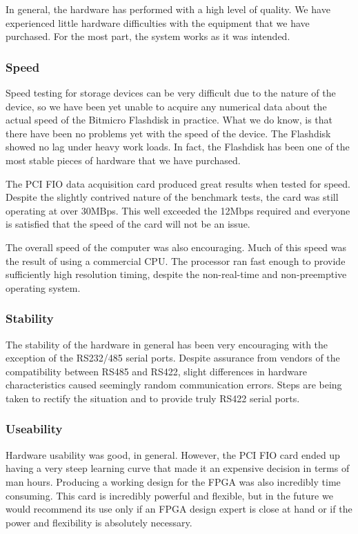 \documentclass[11pt,titlepage]{article}
\begin{document}
In general, the hardware has performed with a high level of quality. We have experienced little hardware difficulties with the equipment that 
we have purchased. For the most part, the system works as it was
intended. 

\subsubsection{Speed}
Speed testing for storage devices can be very difficult due to the nature of the device, so we have been yet unable to acquire any numerical
data about the actual speed of the Bitmicro Flashdisk in practice. What we do know, is that there have been no problems yet with the speed of
the device. The Flashdisk showed no lag under heavy work loads. In fact, the Flashdisk has been one of the most stable pieces of hardware that
we have purchased.

The PCI FIO data acquisition card produced great results when tested for speed. Despite the slightly contrived nature of the benchmark tests, 
the card was still operating at over 30MBps. This well exceeded the 12Mbps required and everyone is satisfied that the speed of the card will
not be an issue.

The overall speed of the computer was also encouraging. Much of this speed was the result of using a commercial CPU. The processor ran fast enough
to provide sufficiently high resolution timing, despite the non-real-time and non-preemptive operating system.
 
\subsubsection{Stability}

The stability of the hardware in general has been very encouraging with the exception of the RS232/485 serial ports. Despite assurance from
vendors of the compatibility between RS485 and RS422, slight differences in hardware characteristics caused seemingly random communication 
errors. Steps are being taken to rectify the situation and to provide truly RS422 serial ports.

\subsubsection{Useability}

Hardware usability was good, in general. However, the PCI FIO card ended up having a very steep learning curve that made it an expensive decision
in terms of man hours. Producing a working design for the FPGA was also incredibly time consuming. This card is incredibly powerful and flexible,
but in the future we would recommend its use only if an FPGA design expert is close at hand or if the power and flexibility is absolutely
necessary.
\end{document}
